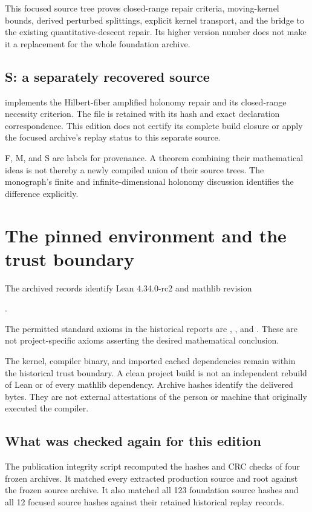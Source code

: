 \documentclass[11pt]{article}
\begin{document}
This focused source tree proves closed-range repair criteria, moving-kernel bounds, derived perturbed splittings, explicit kernel transport, and the bridge to the existing quantitative-descent repair. Its higher version number does not make it a replacement for the whole foundation archive.

\subsection{S: a separately recovered source}
 implements the Hilbert-fiber amplified holonomy repair and its closed-range necessity criterion. The file is retained with its hash and exact declaration correspondence. This edition does not certify its complete build closure or apply the focused archive's replay status to this separate source.

\begin{insight}
F, M, and S are labels for provenance. A theorem combining their mathematical ideas is not thereby a newly compiled union of their source trees. The monograph's finite and infinite-dimensional holonomy discussion identifies the difference explicitly.
\end{insight}

\clearpage\section{The pinned environment and the trust boundary}
The archived records identify Lean 4.34.0-rc2 and mathlib revision
\begin{center}\small{}.\end{center}
The permitted standard axioms in the historical reports are , , and . These are not project-specific axioms asserting the desired mathematical conclusion.

The kernel, compiler binary, and imported cached dependencies remain within the historical trust boundary. A clean project build is not an independent rebuild of Lean or of every mathlib dependency. Archive hashes identify the delivered bytes. They are not external attestations of the person or machine that originally executed the compiler.

\subsection{What was checked again for this edition}
The publication integrity script recomputed the hashes and CRC checks of four frozen archives. It matched every extracted production source and root against the frozen source archive. It also matched all 123 foundation source hashes and all 12 focused source hashes against their retained historical replay records.
\end{document}
